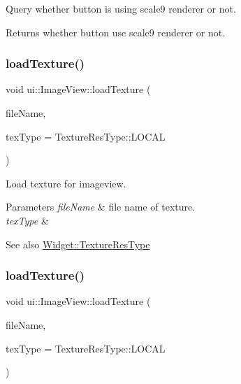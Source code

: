 Query whether button is using scale9 renderer or not. \begin{DoxyReturn}{Returns}
whether button use scale9 renderer or not. 
\end{DoxyReturn}
\mbox{\label{classui_1_1ImageView_a68ef2268cecbf1ccaf2efb05254e01c5}} 
\subsubsection{\texorpdfstring{load\+Texture()}{loadTexture()}\hspace{0.1cm}{\footnotesize\ttfamily [1/2]}}
{\footnotesize\ttfamily void ui\+::\+Image\+View\+::load\+Texture (\begin{DoxyParamCaption}\item[{const std\+::string \&}]{file\+Name,  }\item[{\hyperlink{classui_1_1Widget_a040a65ec5ad3b11119b7e16b98bd9af0}{Texture\+Res\+Type}}]{tex\+Type = {\ttfamily TextureResType\+:\+:LOCAL} }\end{DoxyParamCaption})}

Load texture for imageview.


\begin{DoxyParams}{Parameters}
{\em file\+Name} & file name of texture. \\
\hline
{\em tex\+Type} & \\
\hline
\end{DoxyParams}
\begin{DoxySeeAlso}{See also}
{\ttfamily \hyperlink{classui_1_1Widget_a040a65ec5ad3b11119b7e16b98bd9af0}{Widget\+::\+Texture\+Res\+Type}} 
\end{DoxySeeAlso}
\mbox{\label{classui_1_1ImageView_a68ef2268cecbf1ccaf2efb05254e01c5}} 
\subsubsection{\texorpdfstring{load\+Texture()}{loadTexture()}\hspace{0.1cm}{\footnotesize\ttfamily [2/2]}}
{\footnotesize\ttfamily void ui\+::\+Image\+View\+::load\+Texture (\begin{DoxyParamCaption}\item[{const std\+::string \&}]{file\+Name,  }\item[{\hyperlink{classui_1_1Widget_a040a65ec5ad3b11119b7e16b98bd9af0}{Texture\+Res\+Type}}]{tex\+Type = {\ttfamily TextureResType\+:\+:LOCAL} }\end{DoxyParamCaption})}

